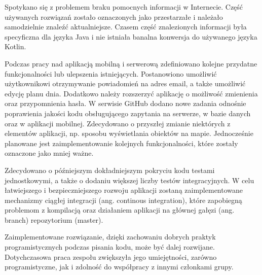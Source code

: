 \par Spotykano się z problemem braku pomocnych informacji w Internecie. Część używanych rozwiązań zostało oznaczonych jako przestarzałe i należało samodzielnie znaleźć aktualniejsze. Czasem część znalezionych informacji była specyficzna dla języka Java i nie istniała banalna konwersja do używanego języka Kotlin.

\par Podczas pracy nad aplikacją mobilną i serwerową zdefiniowano kolejne przydatne funkcjonalności lub ulepszenia istniejących. Postanowiono umożliwić użytkownikowi otrzymywanie powiadomień na adres email, a także umożliwić edycję planu dnia. Dodatkowo należy rozszerzyć aplikację o możliwość zmienienia oraz przypomnienia hasła. W serwisie GitHub dodano nowe zadania odnośnie poprawienia jakości kodu obsługującego zapytania na serwerze, w bazie danych oraz w aplikacji mobilnej. Zdecydowano o przyszłej zmianie niektórych z elementów aplikacji, np. sposobu wyświetlania obiektów na mapie. Jednocześnie planowane jest zaimplementowanie kolejnych funkcjonalności, które zostały oznaczone jako mniej ważne.

\par Zdecydowano o późniejszym dokładniejszym pokryciu kodu testami jednostkowymi, a także o dodaniu większej liczby testów integracyjnych. W celu łatwiejszego i bezpieczniejszego rozwoju aplikacji zostaną zaimplementowane mechanizmy ciągłej integracji (ang. continous integration), które zapobiegną problemom z kompilacją oraz działaniem aplikacji na głównej gałęzi (ang. branch) repozytorium (master).
\par Zaimplementowane rozwiązanie, dzięki zachowaniu dobrych praktyk programistycznych podczas pisania kodu, może być dalej rozwijane. Dotychczasowa praca zespołu zwiększyła jego umiejętności, zarówno programistyczne, jak i zdolność do współpracy z innymi członkami grupy.
